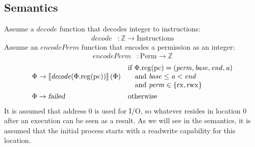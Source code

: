 \documentclass{article}
\newcommand{\sem}[1]{\left\llbracket #1 \right\rrbracket}
\newcommand{\var}[1]{\mathit{#1}}
\newcommand{\pcreg}{\mathrm{pc}}
\newcommand{\addr}{\var{a}}
\newcommand{\start}{\var{base}}
\newcommand{\addrend}{\var{end}}
\newcommand{\perm}{\var{perm}}
\newcommand{\stdcap}[1][\perm]{\left(#1,\start,\addrend,\addr \right)}
\newcommand{\plainproj}[1]{\mathrm{#1}}
\newcommand{\memreg}[1][\Phi]{#1.\plainproj{reg}}
\newcommand{\failed}{\textsl{failed}}
\newcommand{\plainfun}[1]{\mathit{#1}}
\newcommand{\decode}{\plainfun{decode}}
\newcommand{\encodePerm}{\plainfun{encodePerm}}
\newcommand{\plaindom}[1]{\mathrm{#1}}
\newcommand{\Instrs}{\plaindom{Instructions}}
\newcommand{\ints}{\mathbb{Z}}
\newcommand{\Perms}{\plaindom{Perm}}
\newcommand{\plainperm}[1]{\mathrm{#1}}
\newcommand{\exec}{\plainperm{rx}}
\newcommand{\rwx}{\plainperm{rwx}}
\begin{document}
\subsection*{Semantics}
Assume a $\decode$ function that decodes integer to instructions:
\begin{align*}
\decode &:\ints \rightarrow \Instrs
\end{align*}
Assume an $\encodePerm$ function that encodes a permission as an integer:
\begin{align*}
\encodePerm &: \Perms \rightarrow \ints
\end{align*}
\begin{align*}
  \Phi & \rightarrow \sem{\decode(\memreg(\pcreg))}(\Phi) & &                                   
                                                              \arraycolsep=0pt
                                                              \begin{array}{l}
                                                                \text{if $\memreg(\pcreg) = \stdcap$}\\
                                                                \quad\text{and $\start \leq \addr < \addrend$}\\
                                                                \quad\text{and $\perm \in \{ \exec,\rwx \}$ }
                                                              \end{array}\\
\Phi & \rightarrow \failed                                 & & \text{otherwise}
\end{align*}
It is assumed that address 0 is used for I/O, so whatever resides in location 0 after an execution can be seen as a result. As we will see in the semantics, it is assumed that the initial process starts with a readwrite capability for this location.
\end{document}
